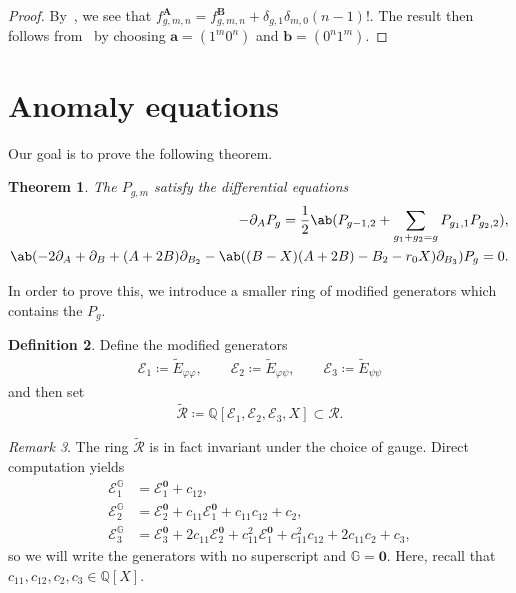\documentclass[10pt]{amsart}
\newtheorem{thm}{Theorem}[section]
\theoremstyle{definition}
\newtheorem{defn}[thm]{Definition}
\theoremstyle{remark}
\newtheorem{rmk}[thm]{Remark}
\theoremstyle{plain}
\theoremstyle{definition}
\theoremstyle{remark}
\newcommand{\G}{\mathbb{G}}
\newcommand{\Q}{\mathbb{Q}}
\newcommand{\ba}{\mathbf{a}}
\newcommand{\bb}{\mathbf{b}}
\newcommand{\bA}{\mathbf{A}}
\newcommand{\bB}{\mathbf{B}}
\newcommand{\bO}{\mathbf{0}}
\newcommand{\msc}[1]{\mathscr{#1}}
\newcommand{\1}{\mathbf{1}}
\newcommand{\2}{\mathbf{2}}
\newcommand{\3}{\mathbf{3}}
\numberwithin{equation}{section}
\begin{document}
\begin{proof}
    By~, we see that $f^{\bA}_{g,m,n} = f^{\bB}_{g,m,n} + \delta_{g,1}\delta_{m,0} (n-1)!$. The result then follows from~ by choosing $\ba = (1^m 0^n)$ and $\bb = (0^n 1^m)$.
\end{proof}


\section{Anomaly equations}%
\label{sec:Holomorphic anomaly equations}

Our goal is to prove the following theorem.
\begin{thm}\label{thm:hae}
    The $P_{g,m}$ satisfy the differential equations
    \begin{align}
    - \partial_{A} P_g = \frac{1}{2} \ab(P_{g-1,2} + \sum_{g_1+g_2 = g} P_{g_1, 1} P_{g_2, 2}), \label{eqn:hae1} \\
    \ab(-2 \partial_{A} + \partial_{B} + (A+2B) \partial_{B_2} - \ab((B-X)(A+2B)-B_2-r_0 X)\partial_{B_3})P_g = 0\label{eqn:hae2}.
    \end{align}
\end{thm}

In order to prove this, we introduce a smaller ring of modified generators which contains the $P_g$. 
\begin{defn}
Define the modified generators
\begin{align*}
    \msc{E}_1 \coloneqq \tilde{E}_{\varphi\varphi}, \qquad
    \msc{E}_2 \coloneqq \tilde{E}_{\varphi\psi}, \qquad
    \msc{E}_3 \coloneqq \tilde{E}_{\psi\psi} 
\end{align*}
and then set
\[ \tilde{\msc{R}} \coloneqq \Q[\msc{E}_1, \msc{E}_2, \msc{E}_3, X] \subset \msc{R}. \]
\end{defn}


\begin{rmk}
    The ring $\tilde{\msc{R}}$ is in fact invariant under the choice of gauge. Direct computation yields
    \begin{align*}
        \msc{E}_1^{\G} &= \msc{E}_1^{\bO} + c_{12}, \\
        \msc{E}_2^{\G} &= \msc{E}_2^{\bO} + c_{11} \msc{E}_1^{\bO} + c_{11}c_{12} + c_2, \\
        \msc{E}_3^{\G} &= \msc{E}_3^{\bO} + 2c_{11} \msc{E}_2^{\bO} + c_{11}^2 \msc{E}_1^{\bO} + c_{11}^2 c_{12} + 2 c_{11}c_2 + c_3,
    \end{align*}
    so we will write the generators with no superscript and $\G = \bO$. Here, recall that $c_{11}, c_{12}, c_2, c_3 \in \Q[X]$.
\end{rmk}
\end{document}
